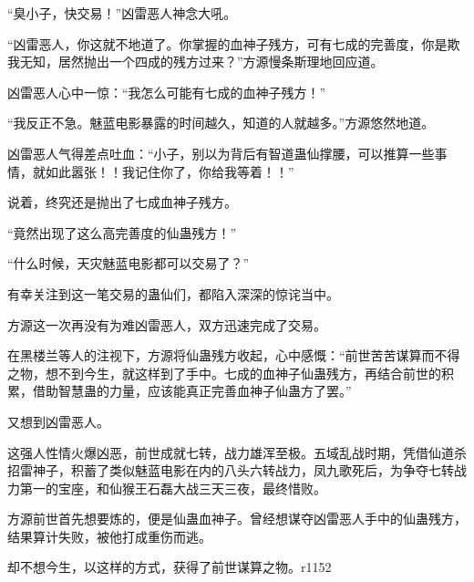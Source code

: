 \begin{this_body}
“臭小子，快交易！”凶雷恶人神念大吼。

“凶雷恶人，你这就不地道了。你掌握的血神子残方，可有七成的完善度，你是欺我无知，居然抛出一个四成的残方过来？”方源慢条斯理地回应道。

凶雷恶人心中一惊：“我怎么可能有七成的血神子残方！”

“我反正不急。魅蓝电影暴露的时间越久，知道的人就越多。”方源悠然地道。

凶雷恶人气得差点吐血：“小子，别以为背后有智道蛊仙撑腰，可以推算一些事情，就如此嚣张！！我记住你了，你给我等着！！”

说着，终究还是抛出了七成血神子残方。

“竟然出现了这么高完善度的仙蛊残方！”

“什么时候，天灾魅蓝电影都可以交易了？”

有幸关注到这一笔交易的蛊仙们，都陷入深深的惊诧当中。

方源这一次再没有为难凶雷恶人，双方迅速完成了交易。

在黑楼兰等人的注视下，方源将仙蛊残方收起，心中感慨：“前世苦苦谋算而不得之物，想不到今生，就这样到了手中。七成的血神子仙蛊残方，再结合前世的积累，借助智慧蛊的力量，应该能真正完善血神子仙蛊方了罢。”

又想到凶雷恶人。

这强人性情火爆凶恶，前世成就七转，战力雄浑至极。五域乱战时期，凭借仙道杀招雷神子，积蓄了类似魅蓝电影在内的八头六转战力，凤九歌死后，为争夺七转战力第一的宝座，和仙猴王石磊大战三天三夜，最终惜败。

方源前世首先想要炼的，便是仙蛊血神子。曾经想谋夺凶雷恶人手中的仙蛊残方，结果算计失败，被他打成重伤而逃。

却不想今生，以这样的方式，获得了前世谋算之物。r1152

\end{this_body}

